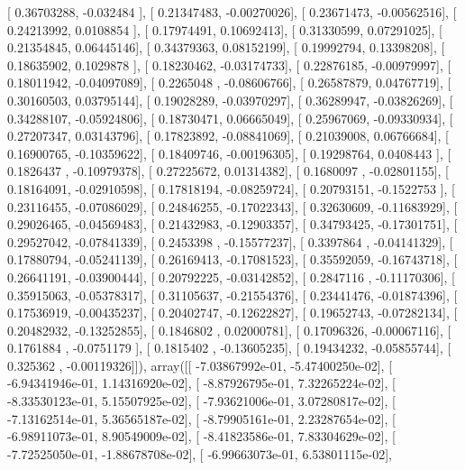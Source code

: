 \documentclass{article}
\begin{document}
       [ 0.36703288, -0.032484  ],
       [ 0.21347483, -0.00270026],
       [ 0.23671473, -0.00562516],
       [ 0.24213992,  0.0108854 ],
       [ 0.17974491,  0.10692413],
       [ 0.31330599,  0.07291025],
       [ 0.21354845,  0.06445146],
       [ 0.34379363,  0.08152199],
       [ 0.19992794,  0.13398208],
       [ 0.18635902,  0.1029878 ],
       [ 0.18230462, -0.03174733],
       [ 0.22876185, -0.00979997],
       [ 0.18011942, -0.04097089],
       [ 0.2265048 , -0.08606766],
       [ 0.26587879,  0.04767719],
       [ 0.30160503,  0.03795144],
       [ 0.19028289, -0.03970297],
       [ 0.36289947, -0.03826269],
       [ 0.34288107, -0.05924806],
       [ 0.18730471,  0.06665049],
       [ 0.25967069, -0.09330934],
       [ 0.27207347,  0.03143796],
       [ 0.17823892, -0.08841069],
       [ 0.21039008,  0.06766684],
       [ 0.16900765, -0.10359622],
       [ 0.18409746, -0.00196305],
       [ 0.19298764,  0.0408443 ],
       [ 0.1826437 , -0.10979378],
       [ 0.27225672,  0.01314382],
       [ 0.1680097 , -0.02801155],
       [ 0.18164091, -0.02910598],
       [ 0.17818194, -0.08259724],
       [ 0.20793151, -0.1522753 ],
       [ 0.23116455, -0.07086029],
       [ 0.24846255, -0.17022343],
       [ 0.32630609, -0.11683929],
       [ 0.29026465, -0.04569483],
       [ 0.21432983, -0.12903357],
       [ 0.34793425, -0.17301751],
       [ 0.29527042, -0.07841339],
       [ 0.2453398 , -0.15577237],
       [ 0.3397864 , -0.04141329],
       [ 0.17880794, -0.05241139],
       [ 0.26169413, -0.17081523],
       [ 0.35592059, -0.16743718],
       [ 0.26641191, -0.03900444],
       [ 0.20792225, -0.03142852],
       [ 0.2847116 , -0.11170306],
       [ 0.35915063, -0.05378317],
       [ 0.31105637, -0.21554376],
       [ 0.23441476, -0.01874396],
       [ 0.17536919, -0.00435237],
       [ 0.20402747, -0.12622827],
       [ 0.19652743, -0.07282134],
       [ 0.20482932, -0.13252855],
       [ 0.1846802 ,  0.02000781],
       [ 0.17096326, -0.00067116],
       [ 0.1761884 , -0.0751179 ],
       [ 0.1815402 , -0.13605235],
       [ 0.19434232, -0.05855744],
       [ 0.325362  , -0.00119326]]), array([[ -7.03867992e-01,  -5.47400250e-02],
       [ -6.94341946e-01,   1.14316920e-02],
       [ -8.87926795e-01,   7.32265224e-02],
       [ -8.33530123e-01,   5.15507925e-02],
       [ -7.93621006e-01,   3.07280817e-02],
       [ -7.13162514e-01,   5.36565187e-02],
       [ -8.79905161e-01,   2.23287654e-02],
       [ -6.98911073e-01,   8.90549009e-02],
       [ -8.41823586e-01,   7.83304629e-02],
       [ -7.72525050e-01,  -1.88678708e-02],
       [ -6.99663073e-01,   6.53801115e-02],
\end{document}
